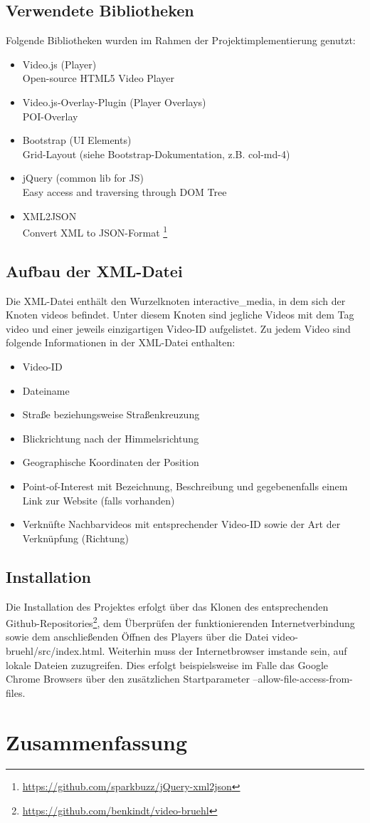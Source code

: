 \section{Verwendete Bibliotheken}
Folgende Bibliotheken wurden im Rahmen der Projektimplementierung genutzt:
\begin{itemize}
\item Video.js (Player) \\ Open-source HTML5 Video Player
\item Video.js-Overlay-Plugin (Player Overlays) \\ POI-Overlay
\item Bootstrap (UI Elements) \\ Grid-Layout (siehe Bootstrap-Dokumentation, z.B. col-md-4)
\item jQuery (common lib for JS) \\ Easy access and traversing through DOM Tree
\item XML2JSON \\ Convert XML to JSON-Format \footnote{\url{https://github.com/sparkbuzz/jQuery-xml2json}}
\end{itemize}
\pagebreak
\section{Aufbau der XML-Datei}
Die XML-Datei enthält den Wurzelknoten \glqq interactive\_media\grqq, in dem sich der Knoten \glqq videos\grqq{} befindet. Unter diesem Knoten sind jegliche Videos mit dem Tag \glqq video\grqq{} und einer jeweils einzigartigen Video-ID aufgelistet. Zu jedem Video sind folgende Informationen in der XML-Datei enthalten:
\begin{itemize}
\item Video-ID
\item Dateiname
\item Straße beziehungsweise Straßenkreuzung
\item Blickrichtung nach der Himmelsrichtung
\item Geographische Koordinaten der Position
\item Point-of-Interest mit Bezeichnung, Beschreibung und gegebenenfalls einem Link zur Website (falls vorhanden)
\item Verknüfte Nachbarvideos mit entsprechender Video-ID sowie der Art der Verknüpfung (Richtung)
\end{itemize}

\section{Installation}
Die Installation des Projektes erfolgt über das Klonen des entsprechenden Github-Repositories\footnote{\url{https://github.com/benkindt/video-bruehl}}, dem Überprüfen der funktionierenden Internetverbindung sowie dem anschließenden Öffnen des Players über die Datei \glqq video-bruehl/src/index.html\grqq. Weiterhin muss der Internetbrowser imstande sein, auf lokale Dateien zuzugreifen. Dies erfolgt beispielsweise im Falle das Google Chrome Browsers über den zusätzlichen Startparameter \glqq –allow-file-access-from-files\grqq.



\chapter{Zusammenfassung}
